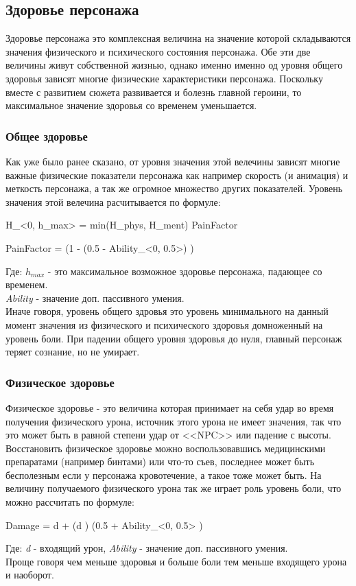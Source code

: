 \documentclass[11pt]{report}
\begin{document}
\subsection{Здоровье персонажа}
Здоровье персонажа это комплексная величина на значение которой складываются значения физического и психического состояния персонажа. Обе эти две величины живут собственной жизнью, однако именно именно од уровня общего здоровья зависят многие физические характеристики персонажа. Поскольку вместе с развитием сюжета развивается и болезнь главной героини, то максимальное значение здоровья со временем уменьшается.

\subsubsection{Общее здоровье}
Как уже было ранее сказано, от уровня значения этой велечины зависят многие важные физические показатели персонажа как например скорость (и анимация) и меткость персонажа, а так же огромное множество других показателей. Уровень значения этой велечина расчитывается по формуле:
\begin{myequation}
		H_{<0, h_{max}>} = min(H_{phys}, H_{ment}) \cdot PainFactor
\end{myequation}
\begin{myequation}
		PainFactor = \left(1 - (0.5 - Ability_{<0, 0.5>}) \cdot {} \right)
\end{myequation}
Где: \begin{math}
	h_{max}
\end{math} - это максимальное возможное здоровье персонажа, падающее со временем.\\
\textit{Ability} - значение доп. пассивного умения.\\

Иначе говоря, уровень общего здровья это уровень минимального на данный момент значения из физического и психического здоровья домноженный на уровень боли. При падении общего уровня здоровья до нуля, главный персонаж теряет сознание, но не умирает.

\subsubsection{Физическое здоровье}
Физическое здоровье - это величина которая принимает на себя удар во время получения физического урона, источник этого урона не имеет значения, так что это может быть в равной степени удар от <<NPC>> или падение с высоты. Восстановить физическое здоровье можно воспользовавшись медицинскими препаратами (например бинтами) или что-то съев, последнее может быть бесполезным если у персонажа кровотечение, а такое тоже может быть.
На величину получаемого физического урона так же играет роль уровень боли, что можно рассчитать по формуле:
\begin{myequation}
	Damage = d + \left(d \cdot {}\right) \cdot \left(0.5 + Ability_{<0, 0.5>} \right)
\end{myequation}
Где: \textit{d} - входящий урон, \textit{Ability} - значение доп. пассивного умения.\\
Проще говоря чем меньше здоровья и больше боли тем меньше входящего урона и наоборот.
\end{document}
